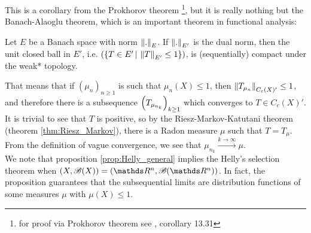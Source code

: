 \begin{unexaminable}
This is a corollary from the Prokhorov theorem \footnote{for proof via Prokhorov theorem see \cite{AchimProbability}, corollary 13.31}, but it is really nothing but the Banach-Alaoglu theorem, which is an important theorem in functional analysis:

\begin{theorem}
Let $E$ be a Banach space with norm $\left\| . \right\|_E$. If $\left\| . \right\|_{E'}$ is the dual norm, then the unit closed ball in $E'$, i.e. $(\left\{ T \in E' \,|\, \left\| T \right\|_{E'} \leq 1 \right \})$, is (sequentially) compact under the weak* topology.
\end{theorem}

That means that if $(\mu_n)_{n\geq 1}$ is such that $\mu_n(X) \leq 1$, then $\left\| T_{\mu_n} \right\|_{C_c(X)'} \leq 1$, and therefore there is a subsequence $\left( T_{\mu_{n_k}} \right)_{k\geq 1}$ which converges to $T \in C_c(X)'$. It is trivial to see that $T$ is positive, so by the Riesz-Markov-Katutani theorem (theorem \ref{thm:Riesz_Markov}), there is a Radon measure $\mu$ such that $T = T_\mu$. From the definition of vague convergence, we see that $\mu_{n_k} \overset{k\to\infty}\to \mu$. \\

We note that proposition \ref{prop:Helly_general} implies the Helly's selection theorem when $(X,\B(X)) = (\R^n, \B(\R^n))$. In fact, the proposition guarantees that the subsequential limits are distribution functions of some measures $\mu$ with $\mu(X) \leq 1$.
\end{unexaminable}
\newpage